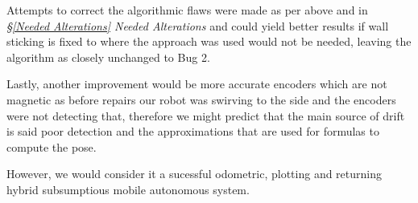 \documentclass[11pt, a4paper]{article}
\begin{document}
\label{Discussion}

Attempts to correct the algorithmic flaws were made as per above and in \textit{\S\ref{Needed Alterations} Needed Alterations}
and could yield better results if wall sticking is fixed to where the approach was used
would not be needed, leaving the algorithm as closely unchanged to Bug 2.

Lastly, another improvement would be more accurate encoders which are not magnetic as before repairs
our robot was swirving to the side and the encoders were not detecting that, therefore we might predict
that the main source of drift is said poor detection and the approximations that are used for formulas
to compute the pose.


However, we would consider it a sucessful odometric, plotting and returning hybrid subsumptious 
mobile autonomous system. 


\end{document}
